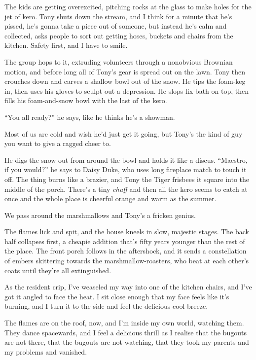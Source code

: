 The kids are getting overexcited, pitching rocks at the glass to
make holes for the jet of kero. Tony shuts down the stream, and I
think for a minute that he's pissed, he's gonna take a piece out of
someone, but instead he's calm and collected, asks people to sort
out getting hoses, buckets and chairs from the kitchen. Safety
first, and I have to smile.

The group hops to it, extruding volunteers through a nonobvious
Brownian motion, and before long all of Tony's gear is spread out
on the lawn. Tony then crouches down and carves a shallow bowl out
of the snow. He tips the foam-keg in, then uses his gloves to
sculpt out a depression. He slops fix-bath on top, then fills his
foam-and-snow bowl with the last of the kero.

``You all ready?'' he says, like he thinks he's a showman.

Most of us are cold and wish he'd just get it going, but Tony's the
kind of guy you want to give a ragged cheer to.

He digs the snow out from around the bowl and holds it like a
discus. ``Maestro, if you would?'' he says to Daisy Duke, who uses
long fireplace match to touch it off. The thing burns like a
brazier, and Tony the Tiger frisbees it square into the middle of
the porch. There's a tiny \emph{chuff} and then all the kero seems
to catch at once and the whole place is cheerful orange and warm as
the summer.

We pass around the marshmallows and Tony's a fricken genius.

\tb

The flames lick and spit, and the house kneels in slow, majestic
stages. The back half collapses first, a cheapie addition that's
fifty years younger than the rest of the place. The front porch
follows in the aftershock, and it sends a constellation of embers
skittering towards the marshmallow-roasters, who beat at each
other's coats until they're all extinguished.

As the resident crip, I've weaseled my way into one of the kitchen
chairs, and I've got it angled to face the heat. I sit close enough
that my face feels like it's burning, and I turn it to the side and
feel the delicious cool breeze.

The flames are on the roof, now, and I'm inside my own world,
watching them. They dance spacewards, and I feel a delicious thrill
as I realise that the bugouts are not there, that the bugouts are
not watching, that they took my parents and my problems and
vanished.

